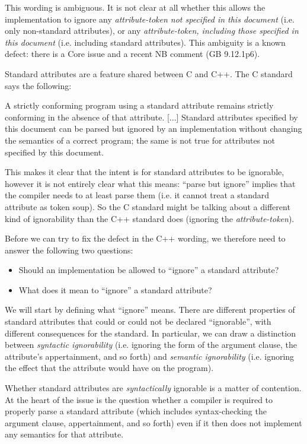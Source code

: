 This wording is ambiguous. It is not clear at all whether this allows the implementation to ignore any  \emph{attribute-token not specified in this document} (i.e. only non-standard attributes), or any  \emph{attribute-token, including those specified in this document} (i.e. including standard attributes). This ambiguity is a known defect: there is a Core issue \cite{CWG2538} and a recent NB comment (GB 9.12.1p6).

Standard attributes are a feature shared between C and C++. The C standard says the following:

\begin{adjustwidth}{0.5cm}{0.5cm}
A strictly conforming program using a standard attribute remains
strictly conforming in the absence of that attribute. [...] Standard attributes specified by this document can be parsed but ignored by an implementation without changing the semantics of a correct program; the same is not true for attributes not specified by this document.
\end{adjustwidth}

This makes it clear that the intent is for standard attributes to be ignorable, however it is not entirely clear what this means: ``parse but ignore'' implies that the compiler needs to at least parse them (i.e. it cannot treat a standard attribute as token soup). So the C standard might be talking about a different kind of ignorability than the C++ standard does (ignoring the \emph{attribute-token}). 

Before we can try to fix the defect in the C++ wording, we therefore need to answer the following two questions:

\begin{itemize}
\item Should an implementation be allowed to ``ignore'' a standard attribute?
\item What does it mean to ``ignore'' a standard attribute?
\end{itemize}

We will start by defining what ``ignore'' means. There are different properties of standard attributes that could or could not be declared ``ignorable'', with different consequences for the standard. In particular, we can draw a distinction between \emph{syntactic ignorability} (i.e. ignoring the form of the argument clause, the attribute's appertainment, and so forth) and \emph{semantic ignorability} (i.e. ignoring the effect that the attribute would have on the program).

Whether standard attributes are \emph{syntactically} ignorable is a matter of contention. At the heart of the issue is the question whether a compiler is required to properly parse a standard attribute (which includes syntax-checking the argument clause, appertainment, and so forth) even if it then does not implement any semantics for that attribute.

